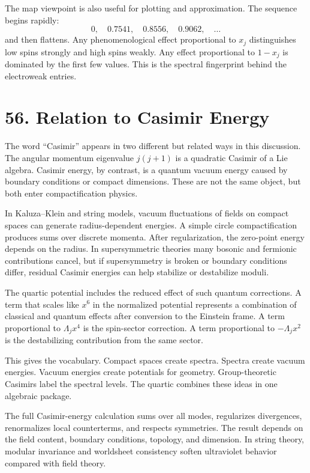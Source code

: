 \documentclass[11pt]{article}
\newcommand{\Lspin}{\Lambda_j}
\begin{document}
The map viewpoint is also useful for plotting and approximation. The sequence begins rapidly:
\[
        0,\quad 0.7541,\quad 0.8556,\quad 0.9062,\quad\ldots
\]
and then flattens. Any phenomenological effect proportional to \(x_j\) distinguishes low spins strongly and high spins weakly. Any effect proportional to \(1-x_j\) is dominated by the first few values. This is the spectral fingerprint behind the electroweak entries.

\section*{56. Relation to Casimir Energy}

The word ``Casimir'' appears in two different but related ways in this discussion. The angular momentum eigenvalue \(j(j+1)\) is a quadratic Casimir of a Lie algebra. Casimir energy, by contrast, is a quantum vacuum energy caused by boundary conditions or compact dimensions. These are not the same object, but both enter compactification physics.

In Kaluza--Klein and string models, vacuum fluctuations of fields on compact spaces can generate radius-dependent energies. A simple circle compactification produces sums over discrete momenta. After regularization, the zero-point energy depends on the radius. In supersymmetric theories many bosonic and fermionic contributions cancel, but if supersymmetry is broken or boundary conditions differ, residual Casimir energies can help stabilize or destabilize moduli.

The quartic potential includes the reduced effect of such quantum corrections. A term that scales like \(x^6\) in the normalized potential represents a combination of classical and quantum effects after conversion to the Einstein frame. A term proportional to \(\Lspin x^4\) is the spin-sector correction. A term proportional to \(-\Lspin x^2\) is the destabilizing contribution from the same sector.

This gives the vocabulary. Compact spaces create spectra. Spectra create vacuum energies. Vacuum energies create potentials for geometry. Group-theoretic Casimirs label the spectral levels. The quartic combines these ideas in one algebraic package.

The full Casimir-energy calculation sums over all modes, regularizes divergences, renormalizes local counterterms, and respects symmetries. The result depends on the field content, boundary conditions, topology, and dimension. In string theory, modular invariance and worldsheet consistency soften ultraviolet behavior compared with field theory.
\end{document}

